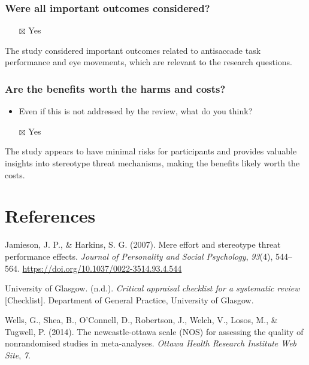 \documentclass[
  doc, a4paper]{apa7}
\providecommand{\tightlist}{%
  \setlength{\itemsep}{0pt}\setlength{\parskip}{0pt}}
\newlength{\cslhangindent}
\newenvironment{CSLReferences}[2] %
 {\begin{list}{}{%
  \setlength{\itemindent}{0pt}
  \setlength{\leftmargin}{0pt}
  \setlength{\parsep}{0pt}
  \ifodd #1
   \setlength{\leftmargin}{\cslhangindent}
   \setlength{\itemindent}{-1\cslhangindent}
  \fi
  \setlength{\itemsep}{#2\baselineskip}}}
 {\end{list}}
\begin{document}
\subsubsection{Were all important outcomes considered?}\label{were-all-important-outcomes-considered}

\begin{itemize}
\tightlist
\item[$\boxtimes$]
  Yes
\end{itemize}

The study considered important outcomes related to antisaccade task performance and eye movements, which are relevant to the research questions.

\subsubsection{Are the benefits worth the harms and costs?}\label{are-the-benefits-worth-the-harms-and-costs}

\begin{itemize}
\tightlist
\item
  Even if this is not addressed by the review, what do you think?
\item[$\boxtimes$]
  Yes
\end{itemize}

The study appears to have minimal risks for participants and provides valuable insights into stereotype threat mechanisms, making the benefits likely worth the costs.

\section{References}\label{references}

\label{refs}
\begin{CSLReferences}{1}{0}
Jamieson, J. P., \& Harkins, S. G. (2007). Mere effort and stereotype threat performance effects. \emph{Journal of Personality and Social Psychology}, \emph{93}(4), 544--564. \url{https://doi.org/10.1037/0022-3514.93.4.544}

University of Glasgow. (n.d.). \emph{Critical appraisal checklist for a systematic review} {[}Checklist{]}. Department of General Practice, University of Glasgow.

Wells, G., Shea, B., O'Connell, D., Robertson, J., Welch, V., Losos, M., \& Tugwell, P. (2014). The newcastle-ottawa scale ({NOS}) for assessing the quality of nonrandomised studies in meta-analyses. \emph{Ottawa Health Research Institute Web Site}, \emph{7}.

\end{CSLReferences}
\end{document}
